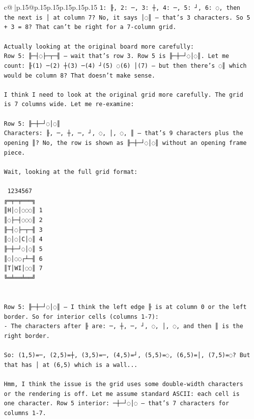 \documentclass{article}
\begin{document}
{\begin{supertabular}{c@{$\;$}|p{.15\linewidth}@{}p{.15\linewidth}p{.15\linewidth}p{.15\linewidth}p{.15\linewidth}p{.15\linewidth}}
{{{\texttt{1: ╟, 2: ─, 3: ┼, 4: ─, 5: ┘, 6: ◌, then the next is │ at column 7? No, it says │◌║ — that's 3 characters. So 5 + 3 = 8? That can't be right for a 7{-}column grid.} \\
\\ 
\texttt{Actually looking at the original board more carefully:} \\
\texttt{Row 5: ╟─┤◌├─┬─╢ — wait that's row 3. Row 5 is ╟─┼─┘◌│◌║. Let me count: ╟(1) ─(2) ┼(3) ─(4) ┘(5) ◌(6) │(7) — but then there's ◌║ which would be column 8? That doesn't make sense.} \\
\\ 
\texttt{I think I need to look at the original grid more carefully. The grid is 7 columns wide. Let me re{-}examine:} \\
\\ 
\texttt{Row 5: ╟─┼─┘◌│◌║} \\
\texttt{Characters: ╟, ─, ┼, ─, ┘, ◌, │, ◌, ║ — that's 9 characters plus the opening ║? No, the row is shown as ╟─┼─┘◌│◌║ without an opening frame piece.} \\
\\ 
\texttt{Wait, looking at the full grid format:} \\
\\ 
\texttt{ 1234567} \\
\texttt{╔═╤═╤═══╗} \\
\texttt{║H│◌│◌◌◌║ 1} \\
\texttt{║◌├─┤◌◌◌║ 2} \\
\texttt{╟─┤◌├─┬─╢ 3} \\
\texttt{║◌│◌│C│◌║ 4} \\
\texttt{╟─┼─┘◌│◌║ 5} \\
\texttt{║◌│◌◌┌┴─╢ 6} \\
\texttt{║T│WI│◌◌║ 7} \\
\texttt{╚═╧══╧══╝} \\
\\ 
\\ 
\texttt{Row 5: ╟─┼─┘◌│◌║ — I think the left edge ╟ is at column 0 or the left border. So for interior cells (columns 1{-}7):} \\
\texttt{{-} The characters after ╟ are: ─, ┼, ─, ┘, ◌, │, ◌, and then ║ is the right border.} \\
\\ 
\texttt{So: (1,5)=─, (2,5)=┼, (3,5)=─, (4,5)=┘, (5,5)=◌, (6,5)=│, (7,5)=◌? But that has │ at (6,5) which is a wall...} \\
\\ 
\texttt{Hmm, I think the issue is the grid uses some double{-}width characters or the rendering is off. Let me assume standard ASCII: each cell is one character. Row 5 interior: ─┼─┘◌│◌ — that's 7 characters for columns 1{-}7.} \\
}}}
\end{supertabular}}
\end{document}
